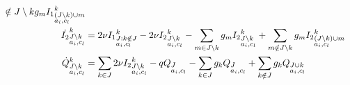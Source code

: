 \documentclass[12pt]{article}
\begin{document}
\begin{footnotesize}
\begin{align}
{  \notin J \setminus k} g_m {I_1}^k_{\begin{subarray}{l} (J \setminus k) \cup m \\ a_i, c_l \end{subarray}}  \notag \\
\dot{I_2}^k_{\begin{subarray}{l}J \setminus k\\ a_i,
    c_l \end{subarray}} &=2 \nu {I_1}^k_{\begin{subarray}{l}J:k
    \notin J\\ a_i, c_l \end{subarray}} -2 \nu {I_2}^k_{\begin{subarray}{l}J \setminus k\\ a_i, c_l \end{subarray}} -\sum_{m
  \in J \setminus k} g_m {I_2}^k_{\begin{subarray}{l}J \setminus k\\ a_i, c_l \end{subarray}} + \sum_{m
  \notin J \setminus k} g_m {I_2}^k_{\begin{subarray}{l} (J \setminus k) \cup m \\ a_i, c_l \end{subarray}} 
\notag \\
\dot{Q}^k_{\begin{subarray}{l}J \setminus k\\ a_i, c_l \end{subarray}}
&= \sum_{k \in J} 2 \nu {I_2}^k_{\begin{subarray}{l}J \setminus k\\
    a_i,
    c_l \end{subarray}} - q Q_{\begin{subarray}{l}J \\
    a_i, c_l \end{subarray}} -\sum_{k \in J} g_k
Q_{\begin{subarray}{l}J\\ a_i, c_l \end{subarray}} + \sum_{k \notin J}
g_k Q_{\begin{subarray}{l}J \cup k \\ a_i, c_l \end{subarray}} \notag
\end{align}
\end{footnotesize}
\end{document}
